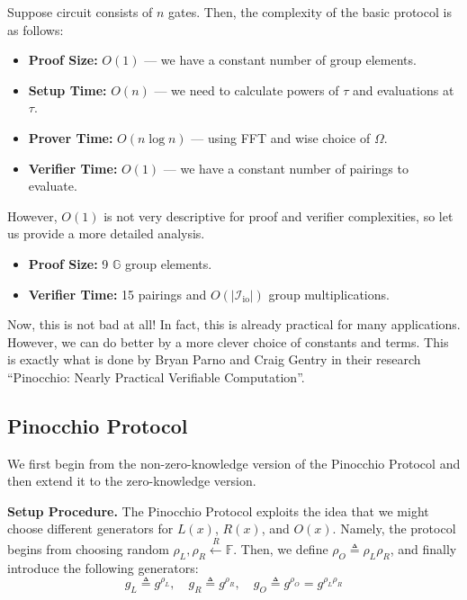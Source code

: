 \documentclass[../lecture-notes-148x210.tex]{subfiles}
\begin{document}
\begin{proposition}
    Suppose circuit consists of $n$ gates. Then, the complexity of the basic protocol is as follows:
    \begin{itemize}
        \item \textbf{Proof Size:} $O(1)$ --- we have a constant number of group elements.
        \item \textbf{Setup Time:} $O(n)$ --- we need to calculate powers of $\tau$ and evaluations at $\tau$.
        \item \textbf{Prover Time:} $O(n \log n)$ --- using FFT and wise choice of $\Omega$.
        \item \textbf{Verifier Time:} $O(1)$ --- we have a constant number of pairings to evaluate.
    \end{itemize}

    However, $O(1)$ is not very descriptive for proof and verifier complexities, so let us provide a more detailed analysis. 
    \begin{itemize}
        \item \textbf{Proof Size:} 9 $\mathbb{G}$ group elements.
        \item \textbf{Verifier Time:} 15 pairings and $O(|\mathcal{I}_{\text{io}}|)$ group multiplications.
    \end{itemize}
\end{proposition}

Now, this is not bad at all! In fact, this is already practical for many applications. However, we can do better by a more clever choice of constants and terms. This is exactly what is done by Bryan Parno and Craig Gentry in their research ``Pinocchio: Nearly Practical Verifiable Computation''.

\subsection{Pinocchio Protocol}

We first begin from the non-zero-knowledge version of the Pinocchio Protocol and then extend it to the zero-knowledge version.

\textcolor{blue!75!gray}{\textbf{Setup Procedure.}} The Pinocchio Protocol exploits the idea that we might 
choose different generators for $L(x)$, $R(x)$, and $O(x)$. 
Namely, the protocol begins from choosing random $\rho_L,\rho_R \xleftarrow{R} \mathbb{F}$. 
Then, we define $\rho_O \triangleq \rho_L\rho_R$, and finally introduce the following generators:
\begin{equation*}
    g_L \triangleq g^{\rho_L}, \quad g_R \triangleq g^{\rho_R}, \quad g_O \triangleq g^{\rho_O} = g^{\rho_L\rho_R}
\end{equation*}
\end{document}
